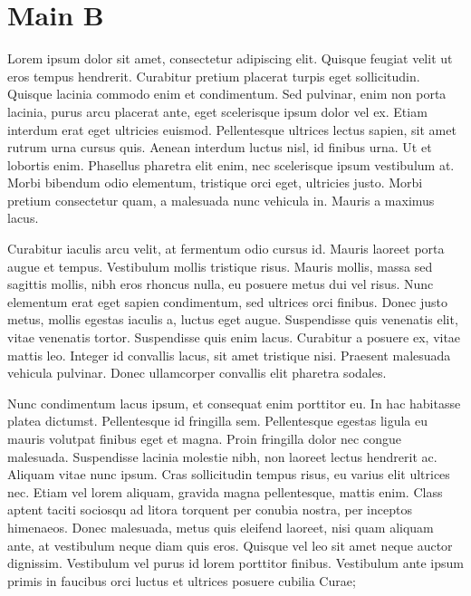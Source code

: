 \section{Main B}
Lorem ipsum dolor sit amet, consectetur adipiscing elit.
Quisque feugiat velit ut eros tempus hendrerit.
Curabitur pretium placerat turpis eget sollicitudin.
Quisque lacinia commodo enim et condimentum.
Sed pulvinar, enim non porta lacinia, purus arcu placerat ante, eget scelerisque ipsum dolor vel ex.
Etiam interdum erat eget ultricies euismod.
Pellentesque ultrices lectus sapien, sit amet rutrum urna cursus quis.
Aenean interdum luctus nisl, id finibus urna.
Ut et lobortis enim.
Phasellus pharetra elit enim, nec scelerisque ipsum vestibulum at.
Morbi bibendum odio elementum, tristique orci eget, ultricies justo.
Morbi pretium consectetur quam, a malesuada nunc vehicula in.
Mauris a maximus lacus.


Curabitur iaculis arcu velit, at fermentum odio cursus id.
Mauris laoreet porta augue et tempus.
Vestibulum mollis tristique risus.
Mauris mollis, massa sed sagittis mollis, nibh eros rhoncus nulla, eu posuere metus dui vel risus.
Nunc elementum erat eget sapien condimentum, sed ultrices orci finibus.
Donec justo metus, mollis egestas iaculis a, luctus eget augue.
Suspendisse quis venenatis elit, vitae venenatis tortor.
Suspendisse quis enim lacus.
Curabitur a posuere ex, vitae mattis leo.
Integer id convallis lacus, sit amet tristique nisi.
Praesent malesuada vehicula pulvinar.
Donec ullamcorper convallis elit pharetra sodales.


Nunc condimentum lacus ipsum, et consequat enim porttitor eu.
In hac habitasse platea dictumst.
Pellentesque id fringilla sem.
Pellentesque egestas ligula eu mauris volutpat finibus eget et magna.
Proin fringilla dolor nec congue malesuada.
Suspendisse lacinia molestie nibh, non laoreet lectus hendrerit ac.
Aliquam vitae nunc ipsum.
Cras sollicitudin tempus risus, eu varius elit ultrices nec.
Etiam vel lorem aliquam, gravida magna pellentesque, mattis enim.
Class aptent taciti sociosqu ad litora torquent per conubia nostra, per inceptos himenaeos.
Donec malesuada, metus quis eleifend laoreet, nisi quam aliquam ante, at vestibulum neque diam quis eros.
Quisque vel leo sit amet neque auctor dignissim.
Vestibulum vel purus id lorem porttitor finibus.
Vestibulum ante ipsum primis in faucibus orci luctus et ultrices posuere cubilia Curae;



